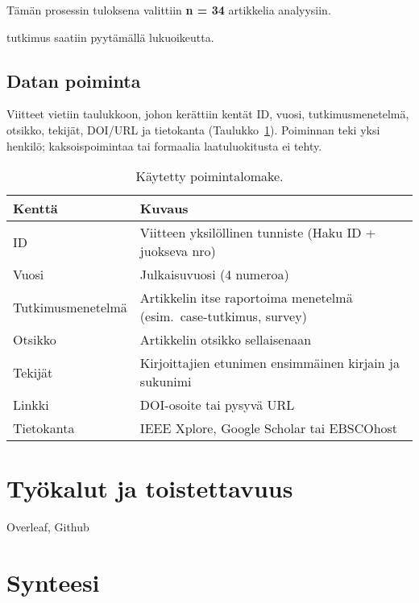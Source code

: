 \documentclass[bscthesis,finnish,oneside,biblatex]{uefcsthesis}
\begin{document}
Tämän prosessin tuloksena valittiin \textbf{n = 34} artikkelia analyysiin.

\cite{ozdenizci2024mobilizing} tutkimus saatiin pyytämällä lukuoikeutta.

\subsection{Datan poiminta}
\label{sec:data-extraction}

Viitteet vietiin taulukkoon, johon kerättiin kentät
ID, vuosi, tutkimusmenetelmä, otsikko, tekijät, DOI/URL ja tietokanta
(Taulukko~\ref{tab:extractionfields}). Poiminnan teki yksi henkilö;
kaksoispoimintaa tai formaalia laatuluokitusta ei tehty.


\begin{table}[htbp]
  \centering
  \footnotesize
  \caption{Käytetty poimintalomake.}
  \label{tab:extractionfields}
  \begin{tabular}{p{3cm}p{8.5cm}}
    \toprule
    \textbf{Kenttä} & \textbf{Kuvaus} \\
    \midrule
    ID           & Viitteen yksilöllinen tunniste (Haku ID + juokseva nro) \\
    Vuosi        & Julkaisuvuosi (4 numeroa) \\
    Tutkimus\-menetelmä & Artikkelin itse raportoima menetelmä (esim.\ case-tutkimus, survey) \\
    Otsikko      & Artikkelin otsikko sellaisenaan \\
    Tekijät      & Kirjoittajien etunimen ensimmäinen kirjain ja sukunimi \\
    Linkki       & DOI-osoite tai pysyvä URL \\
    Tietokanta   & IEEE Xplore, Google Scholar tai EBSCOhost \\
    \bottomrule
  \end{tabular}
\end{table}


\section{Työkalut ja toistettavuus}
\label{sec:tools}
Overleaf, Github

\section{Synteesi}
\label{sec:synthesis}
\end{document}
